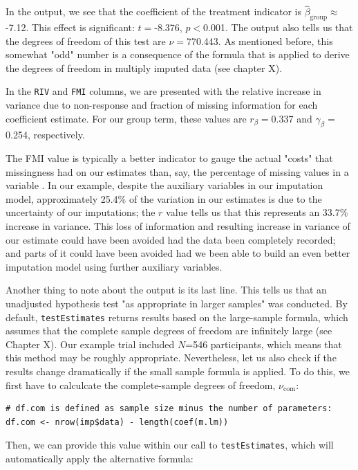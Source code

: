 In the output, we see that the coefficient of the treatment indicator is $\hat{\beta}_{\text{group}}\approx$-7.12. This effect is significant: $t=$-8.376, $p<$0.001. The output also tells us that the degrees of freedom of this test are $\nu=$770.443. As mentioned before, this somewhat "odd" number is a consequence of the formula that is applied to derive the degrees of freedom in multiply imputed data (see chapter X). 

In the \texttt{RIV} and \texttt{FMI} columns, we are presented with the relative increase in variance due to non-response and fraction of missing information for each coefficient estimate. For our group term, these values are $r_{\beta}=$0.337 and $\gamma_{\beta}=$0.254, respectively. 

The FMI value is typically a better indicator to gauge the actual "costs" that missingness had on our estimates than, say, the percentage of missing values in a variable \citep{madley2019proportion}. In our example, despite the auxiliary variables in our imputation model, approximately 25.4\% of the variation in our estimates is due to the uncertainty of our imputations; the $r$ value tells us that this represents an 33.7\% increase in variance. This loss of information and resulting increase in variance of our estimate could have been avoided had the data been completely recorded; and parts of it could have been avoided had we been able to build an even better imputation model using further auxiliary variables. 

Another thing to note about the output is its last line. This tells us that an unadjusted hypothesis test "as appropriate in larger samples" was conducted. By default, \texttt{testEstimates} returns results based on the large-sample formula, which assumes that the complete sample degrees of freedom are infinitely large (see Chapter X). Our example trial included $N$=546 participants, which means that this method may be roughly appropriate. Nevertheless, let us also check if the results change dramatically if the small sample formula is applied. To do this, we first have to calculcate the complete-sample degrees of freedom, $\nu_{\text{com}}$:

\begin{lstlisting}
# df.com is defined as sample size minus the number of parameters:
df.com <- nrow(imp$data) - length(coef(m.lm))
\end{lstlisting}

Then, we can provide this value within our call to \texttt{testEstimates}, which will automatically apply the alternative formula:

